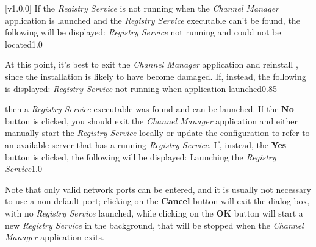 [v1.0.0]
If the \emph{Registry Service} is not running when the \emph{Channel Manager} application
is launched and the \emph{Registry Service} executable can't be found, the following will
be displayed:
%
{\emph{Registry Service} not running and could not be located}{1.0}

At this point, it's best to exit the \emph{Channel Manager} application and reinstall
\mplusm, since the installation is likely to have become damaged.
If, instead, the following is displayed:
%
{\emph{Registry Service} not running when application launched}{0.85}

then a \emph{Registry Service} executable was found and can be launched.
If the \textbf{No} button is clicked, you should exit the \emph{Channel Manager}
application and either manually start the \emph{Registry Service} locally or update the
\yarp{} configuration to refer to an available \yarp{} server that has a running
\emph{Registry Service}.
\condPage{}
If, instead, the \textbf{Yes} button is clicked, the following will be displayed:
%
{Launching the \emph{Registry Service}}{1.0}

Note that only valid network ports can be entered, and it is usually not necessary to use
a non-default port; clicking on the \textbf{Cancel} button will exit the dialog box, with
no \emph{Registry Service} launched, while clicking on the \textbf{OK} button will start a
new \emph{Registry Service} in the background, that will be stopped when the
\emph{Channel Manager} application exits.
\appendixEnd{}

